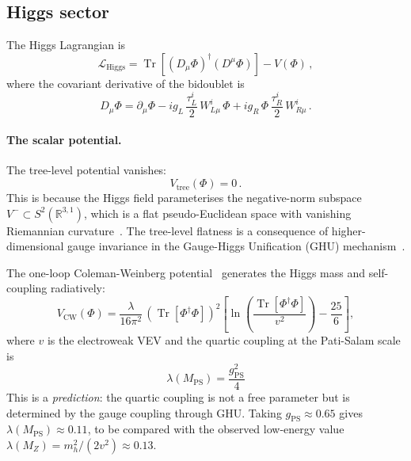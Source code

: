 \documentclass[12pt,a4paper]{article}
\theoremstyle{definition}
\newcommand{\Tr}{\operatorname{Tr}}
\newcommand{\R}{\mathbb{R}}
\newcommand{\MPS}{M_{\mathrm{PS}}}
\newcommand{\gPS}{g_{\mathrm{PS}}}
\begin{document}
\subsection{Higgs sector}

The Higgs Lagrangian is
\begin{equation}
\label{eq:L_higgs}
\mathcal{L}_{\mathrm{Higgs}} = \Tr\!\left[(D_\mu \Phi)^\dagger (D^\mu \Phi)\right] - V(\Phi)\,,
\end{equation}
where the covariant derivative of the bidoublet is
\begin{equation}
D_\mu \Phi = \partial_\mu \Phi - i g_L\, \frac{\tau^i_L}{2}\, W^i_{L\mu}\, \Phi + i g_R\, \Phi\, \frac{\tau^i_R}{2}\, W^i_{R\mu}\,.
\end{equation}

\paragraph{The scalar potential.}
The tree-level potential vanishes:
\begin{equation}
\label{eq:V_tree}
V_{\mathrm{tree}}(\Phi) = 0\,.
\end{equation}
This is because the Higgs field parameterises the negative-norm subspace $V^- \subset S^2(\R^{3,1})$, which is a flat pseudo-Euclidean space with vanishing Riemannian curvature~\cite{Paper1}.
The tree-level flatness is a consequence of higher-dimensional gauge invariance in the Gauge-Higgs Unification (GHU) mechanism~\cite{Hosotani1983,HatanakaHosotani1998}.

The one-loop Coleman-Weinberg potential~\cite{ColemanWeinberg1973} generates the Higgs mass and self-coupling radiatively:
\begin{equation}
\label{eq:V_CW}
V_{\mathrm{CW}}(\Phi) = \frac{\lambda}{16\pi^2}\, \left(\Tr[\Phi^\dagger \Phi]\right)^2 \left[\ln\!\left(\frac{\Tr[\Phi^\dagger \Phi]}{v^2}\right) - \frac{25}{6}\right],
\end{equation}
where $v$ is the electroweak VEV and the quartic coupling at the Pati-Salam scale is
\begin{equation}
\label{eq:quartic}
\boxed{\lambda(\MPS) = \frac{\gPS^2}{4}}
\end{equation}
This is a \emph{prediction}: the quartic coupling is not a free parameter but is determined by the gauge coupling through GHU.
Taking $\gPS \approx 0.65$ gives $\lambda(\MPS) \approx 0.11$, to be compared with the observed low-energy value $\lambda(M_Z) = m_h^2/(2v^2) \approx 0.13$.
\end{document}
